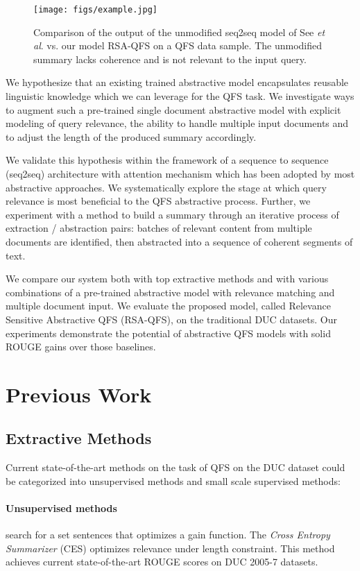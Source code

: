 \documentclass[11pt,a4paper]{article}
\begin{document}
\begin{figure} 
  \centering 
  \texttt{[image: figs/example.jpg]} 
  \caption{Comparison of the output of the unmodified seq2seq model of See \emph{et al}. vs. our model RSA-QFS on a QFS data sample. The unmodified summary lacks coherence and is not relevant to the input query.}
  \label{fig:RSAexample} 
\end{figure} 

We hypothesize that an existing trained abstractive model encapsulates reusable linguistic knowledge which we can leverage for the QFS task. We investigate ways to augment such a pre-trained single document abstractive model with explicit modeling of query relevance, the ability to handle multiple input documents and to adjust the length of the produced summary accordingly.  

We validate this hypothesis within the framework of a sequence to sequence (seq2seq) architecture with attention mechanism which has been adopted by most abstractive approaches.  We systematically explore the stage at which query relevance is most beneficial to the QFS abstractive process.  Further, we experiment with a method to build a summary through an iterative process of extraction / abstraction pairs: batches of relevant content from multiple documents are identified, then abstracted into a sequence of coherent segments of text. 

We compare our system both with top extractive methods and with various combinations of a pre-trained abstractive model with relevance matching and multiple document input.  We evaluate the proposed model, called Relevance Sensitive Abstractive QFS (RSA-QFS), on the traditional DUC datasets.  Our experiments demonstrate the potential of abstractive QFS models with solid ROUGE gains over those baselines.

\section{Previous Work}

\subsection{Extractive Methods}

Current state-of-the-art methods on the task of QFS on the DUC dataset could be categorized into unsupervised methods and small scale supervised methods:

\paragraph*{Unsupervised methods} search for a set sentences that optimizes a gain function. The \emph{ Cross Entropy Summarizer} (CES) \cite{Feigenblat:2017:UQM:3077136.3080690} optimizes relevance under length constraint.  This method achieves current state-of-the-art ROUGE scores on DUC 2005-7 datasets.
\end{document}
